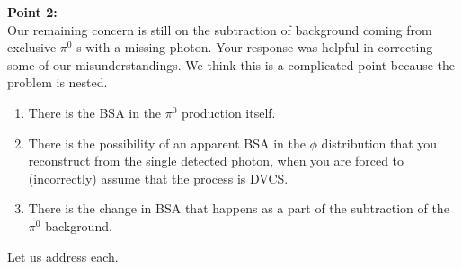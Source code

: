 \documentclass[a4paper,11pt,twoside]{article}
\begin{document}
\textbf{Point 2:} \\
Our remaining concern is still on the subtraction of background coming from exclusive $\pi^0$ s with a missing photon.
Your response was helpful in correcting some of our misunderstandings. We think this is a complicated point
because the problem is nested.
\begin{enumerate}
\item There is the BSA in the $\pi^0$ production itself.
\item There is the possibility of an apparent BSA in the $\phi$ distribution that you reconstruct from the single detected
photon, when you are forced to (incorrectly) assume that the process is DVCS.
\item There is the change in BSA that happens as a part of the subtraction of the $\pi^0$ background.
\end{enumerate}
Let us address each.
\end{document}

